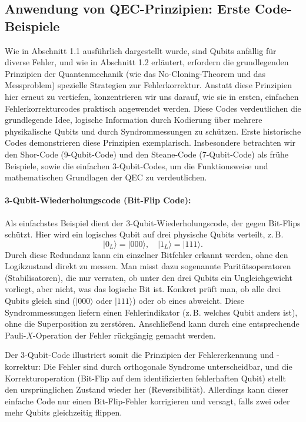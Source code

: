 \subsection{Anwendung von QEC-Prinzipien: Erste Code-Beispiele}

Wie in Abschnitt 1.1 ausführlich dargestellt wurde, sind Qubits anfällig für diverse
Fehler, und wie in Abschnitt 1.2 erläutert, erfordern die grundlegenden Prinzipien der
Quantenmechanik (wie das No-Cloning-Theorem und das Messproblem) spezielle
Strategien zur Fehlerkorrektur. Anstatt diese Prinzipien hier erneut zu vertiefen,
konzentrieren wir uns darauf, wie sie in ersten, einfachen Fehlerkorrekturcodes
praktisch angewendet werden. Diese Codes verdeutlichen die grundlegende Idee,
logische Information durch Kodierung über mehrere physikalische Qubits und durch
Syndrommessungen zu schützen.
Erste historische Codes demonstrieren diese Prinzipien exemplarisch. Insbesondere betrachten wir den Shor-Code (9-Qubit-Code) und den Steane-Code (7-Qubit-Code) als frühe Beispiele, sowie die einfachen 3-Qubit-Codes, um die Funktionsweise und mathematischen Grundlagen der QEC zu verdeutlichen.
\cite[Seite 427-430]{nielsen_quantum_2010}\\

\paragraph{3-Qubit-Wiederholungscode (Bit-Flip Code):}
Als einfachstes Beispiel dient der 3-Qubit-Wiederholungscode, der gegen Bit-Flips schützt. Hier wird ein logisches Qubit auf drei physische Qubits verteilt, z.\,B.
\[
\lvert 0_L \rangle = \lvert 000 \rangle, \quad \lvert 1_L \rangle = \lvert 111 \rangle.
\]
Durch diese Redundanz kann ein einzelner Bitfehler erkannt werden, ohne den Logikzustand direkt zu messen. Man misst dazu sogenannte Paritätsoperatoren (Stabilisatoren), die nur verraten, ob unter den drei Qubits ein Ungleichgewicht vorliegt, aber nicht, was das logische Bit ist. Konkret prüft man, ob alle drei Qubits gleich sind (\(\lvert 000 \rangle\) oder \(\lvert 111 \rangle\)) oder ob eines abweicht. Diese Syndrommessungen liefern einen Fehlerindikator (z.\,B. welches Qubit anders ist), ohne die Superposition zu zerstören. Anschließend kann durch eine entsprechende Pauli-\(X\)-Operation der Fehler rückgängig gemacht werden.

Der 3-Qubit-Code illustriert somit die Prinzipien der Fehlererkennung und -korrektur: Die Fehler sind durch orthogonale Syndrome unterscheidbar, und die Korrekturoperation (Bit-Flip auf dem identifizierten fehlerhaften Qubit) stellt den ursprünglichen Zustand wieder her (Reversibilität). Allerdings kann dieser einfache Code nur einen Bit-Flip-Fehler korrigieren und versagt, falls zwei oder mehr Qubits gleichzeitig flippen.
\cite[Seite 430-431]{nielsen_quantum_2010}\\


